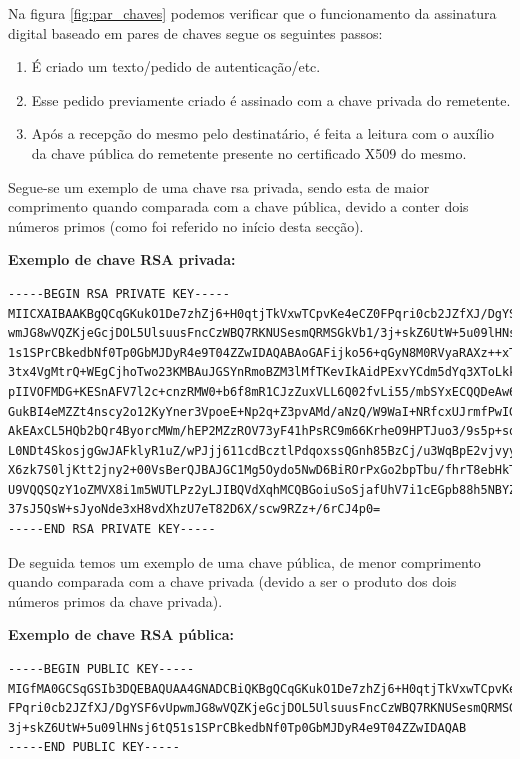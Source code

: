 Na figura \ref{fig:par_chaves} podemos verificar que o funcionamento da assinatura digital baseado em pares de chaves segue os seguintes passos:

\begin{enumerate}
    \item É criado um texto/pedido de autenticação/etc.
    \item Esse pedido previamente criado é assinado com a chave privada do remetente.
    \item Após a recepção do mesmo pelo destinatário, é feita a leitura com o auxílio da chave pública do remetente presente no certificado X509 do mesmo.
\end{enumerate}

Segue-se um exemplo de uma chave \gls{rsa} privada, sendo esta de maior comprimento quando comparada com a chave pública, devido a conter dois números primos (como foi referido no início desta secção).

\vspace{5mm}
\textbf{Exemplo de chave RSA privada:}

\begin{verbatim}
-----BEGIN RSA PRIVATE KEY-----
MIICXAIBAAKBgQCqGKukO1De7zhZj6+H0qtjTkVxwTCpvKe4eCZ0FPqri0cb2JZfXJ/DgYSF6vUp
wmJG8wVQZKjeGcjDOL5UlsuusFncCzWBQ7RKNUSesmQRMSGkVb1/3j+skZ6UtW+5u09lHNsj6tQ5
1s1SPrCBkedbNf0Tp0GbMJDyR4e9T04ZZwIDAQABAoGAFijko56+qGyN8M0RVyaRAXz++xTqHBLh
3tx4VgMtrQ+WEgCjhoTwo23KMBAuJGSYnRmoBZM3lMfTKevIkAidPExvYCdm5dYq3XToLkkLv5L2
pIIVOFMDG+KESnAFV7l2c+cnzRMW0+b6f8mR1CJzZuxVLL6Q02fvLi55/mbSYxECQQDeAw6fiIQX
GukBI4eMZZt4nscy2o12KyYner3VpoeE+Np2q+Z3pvAMd/aNzQ/W9WaI+NRfcxUJrmfPwIGm63il
AkEAxCL5HQb2bQr4ByorcMWm/hEP2MZzROV73yF41hPsRC9m66KrheO9HPTJuo3/9s5p+sqGxOlF
L0NDt4SkosjgGwJAFklyR1uZ/wPJjj611cdBcztlPdqoxssQGnh85BzCj/u3WqBpE2vjvyyvyI5k
X6zk7S0ljKtt2jny2+00VsBerQJBAJGC1Mg5Oydo5NwD6BiROrPxGo2bpTbu/fhrT8ebHkTz2epl
U9VQQSQzY1oZMVX8i1m5WUTLPz2yLJIBQVdXqhMCQBGoiuSoSjafUhV7i1cEGpb88h5NBYZzWXGZ
37sJ5QsW+sJyoNde3xH8vdXhzU7eT82D6X/scw9RZz+/6rCJ4p0=
-----END RSA PRIVATE KEY-----
\end{verbatim}

De seguida temos um exemplo de uma chave pública, de menor comprimento quando comparada com a chave privada (devido a ser o produto dos dois números primos da chave privada).

\vspace{5mm}
\textbf{Exemplo de chave RSA pública:}

\begin{verbatim}
-----BEGIN PUBLIC KEY-----
MIGfMA0GCSqGSIb3DQEBAQUAA4GNADCBiQKBgQCqGKukO1De7zhZj6+H0qtjTkVxwTCpvKe4eCZ0
FPqri0cb2JZfXJ/DgYSF6vUpwmJG8wVQZKjeGcjDOL5UlsuusFncCzWBQ7RKNUSesmQRMSGkVb1/
3j+skZ6UtW+5u09lHNsj6tQ51s1SPrCBkedbNf0Tp0GbMJDyR4e9T04ZZwIDAQAB
-----END PUBLIC KEY-----
\end{verbatim}

